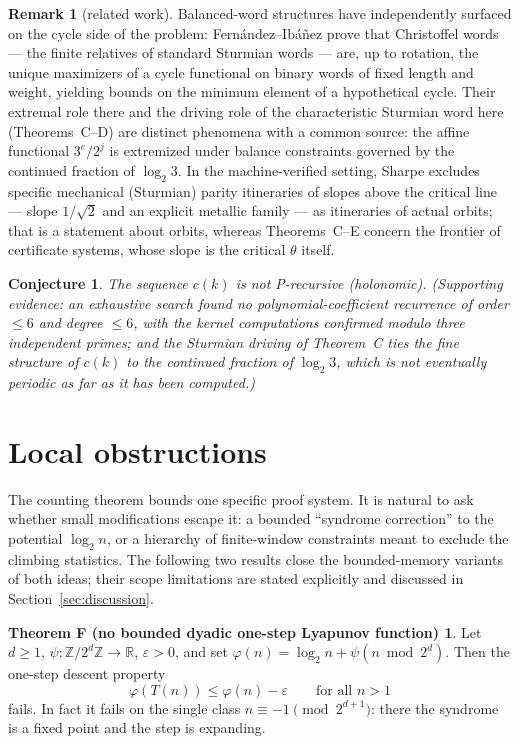 \documentclass[11pt]{article}
\newtheorem{conjecture}[theorem]{Conjecture}
\theoremstyle{definition}
\newtheorem{remark}[theorem]{Remark}
\newtheorem*{thmF}{Theorem F (no bounded dyadic one-step Lyapunov function)}
\newcommand{\Z}{\mathbb{Z}}
\newcommand{\R}{\mathbb{R}}
\begin{document}
\begin{remark}[related work]\label{rem:sturmrelated}
Balanced-word structures have independently surfaced on the cycle side of
the problem: Fern\'andez--Ib\'a\~nez \cite{FernandezIbanez2026} prove that
Christoffel words --- the finite relatives of standard Sturmian words ---
are, up to rotation, the unique maximizers of a cycle functional on binary
words of fixed length and weight, yielding bounds on the minimum element
of a hypothetical cycle. Their extremal role there and the driving role of
the characteristic Sturmian word here (Theorems~C--D) are distinct
phenomena with a common source: the affine functional $3^{e}/2^{j}$ is
extremized under balance constraints governed by the continued fraction of
$\log_2 3$. In the machine-verified setting, Sharpe \cite{Sharpe2026}
excludes specific mechanical (Sturmian) parity itineraries of slopes above
the critical line --- slope $1/\sqrt2$ and an explicit metallic family ---
as itineraries of actual orbits; that is a statement about orbits, whereas
Theorems~C--E concern the frontier of certificate systems, whose slope is
the critical $\theta$ itself.
\end{remark}

\begin{conjecture}\label{conj:precursive}
The sequence $c(k)$ is not P-recursive (holonomic). (Supporting evidence: an
exhaustive search found no polynomial-coefficient recurrence of order
$\le 6$ and degree $\le 6$, with the kernel computations confirmed modulo
three independent primes; and the Sturmian driving of Theorem~C ties the
fine structure of $c(k)$ to the continued fraction of $\log_2 3$, which is
not eventually periodic as far as it has been computed.)
\end{conjecture}

\section{Local obstructions}\label{sec:local}

The counting theorem bounds one specific proof system. It is natural to ask
whether small modifications escape it: a bounded ``syndrome correction'' to
the potential $\log_2 n$, or a hierarchy of finite-window constraints meant
to exclude the climbing statistics. The following two results close the
bounded-memory variants of both ideas; their scope limitations are stated
explicitly and discussed in Section~\ref{sec:discussion}.

\begin{thmF}
Let $d\ge 1$, $\psi:\Z/2^d\Z\to\R$, $\varepsilon>0$, and set
$\varphi(n)=\log_2 n+\psi(n\bmod 2^d)$. Then the one-step descent property
\[
\varphi(T(n))\le\varphi(n)-\varepsilon\qquad\text{for all } n>1
\]
fails. In fact it fails on the single class $n\equiv -1 \pmod{2^{d+1}}$:
there the syndrome is a fixed point and the step is expanding.
\end{thmF}
\end{document}
